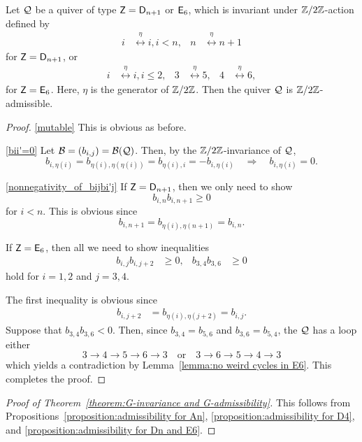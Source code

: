 \begin{proposition}\label{proposition:admissibility for Dn and E6}
Let $\mathcal{Q}$ be a quiver of type $\mathsf{Z}=\mathsf{D}_{n+1}$ or $\mathsf{E}_6$, which is invariant under $\mathbb{Z}/2\mathbb{Z}$-action defined by
\begin{align*}
i&\stackrel{\eta}{\longleftrightarrow} i, i < n,&
n&\stackrel{\eta}{\longleftrightarrow} n+1
\end{align*}
for $\mathsf{Z}=\mathsf{D}_{n+1}$, or
\begin{align*}
i&\stackrel{\eta}{\longleftrightarrow} i, i\le 2,&
3&\stackrel{\eta}{\longleftrightarrow} 5,&
4&\stackrel{\eta}{\longleftrightarrow} 6,
\end{align*}
for $\mathsf{Z}=\mathsf{E}_6$.
Here, $\eta$ is the generator of $\mathbb{Z}/2\mathbb{Z}$.
Then the quiver $\mathcal{Q}$ is $\mathbb{Z}/2\mathbb{Z}$-admissible.
\end{proposition}
\begin{proof}
\noindent \eqref{mutable} This is obvious as before.

\noindent \eqref{bii'=0} Let $\mathcal{B}=(b_{i,j})=\mathcal{B}(\mathcal{Q})$. Then, by the $\mathbb{Z}/2\mathbb{Z}$-invariance of $\mathcal{Q}$, 
\[
b_{i,\eta(i)}=b_{\eta(i), \eta(\eta(i))} = b_{\eta(i), i} = -b_{i, \eta(i)}\quad
\Longrightarrow\quad
b_{i,\eta(i)}=0.
\]

\noindent \eqref{nonnegativity_of_bijbi'j} If $\mathsf{Z}=\mathsf{D}_{n+1}$, then we only need to show
\[
b_{i,n}b_{i,n+1}\ge 0
\]
for $i<n$. This is obvious since 
\[
b_{i,n+1} = b_{\eta(i), \eta(n+1)} = b_{i,n}.
\]

If $\mathsf{Z}=\mathsf{E}_6$, then all we need to show inequalities
\begin{align*}
b_{i,j}b_{i,j+2}&\ge 0,&
b_{3,4}b_{3,6}&\ge 0
\end{align*}
hold for $i=1,2$ and $j=3,4$.

The first inequality is obvious since
\begin{align*}
b_{i,j+2}&=b_{\eta(i),\eta(j+2)} = b_{i,j}.
\end{align*}
Suppose that $b_{3,4}b_{3,6}<0$. Then, since $b_{3,4}=b_{5,6}$ and $b_{3,6}=b_{5,4}$, the $\mathcal{Q}$ has a loop either
\[
3\to 4\to 5\to 6 \to 3\quad\text{or}\quad
3\to 6\to 5\to 4 \to 3
\]
which yields a contradiction by Lemma~\ref{lemma:no weird cycles in E6}. This completes the proof.
\end{proof}

\begin{proof}[Proof of Theorem~\ref{theorem:G-invariance and G-admissibility}]
This follows from Propositions~\ref{proposition:admissibility for An}, \ref{proposition:admissibility for D4}, and \ref{proposition:admissibility for Dn and E6}.
\end{proof}


